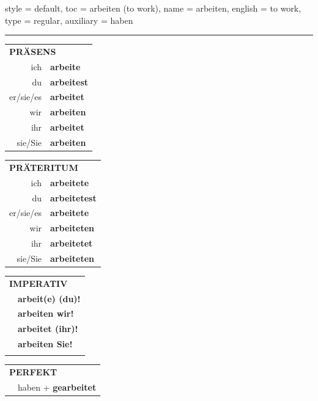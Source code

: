 \begin{verbentry}{
  style = {default},
  toc = {arbeiten (to work)},
  name = {arbeiten},
  english = {to work},
  type = {regular},
  auxiliary = {haben}
}
 
    
     \vspace{5pt}

    \hrule
    
    \vspace{5pt}

  \begin{tabular}{rl}
     \multicolumn{2}{l}{\textbf{PRÄSENS} }\\
    ich & \textbf{arbeite}\\
    du & \textbf{arbeitest}\\
    er/sie/es & \textbf{arbeitet}\\
    wir & \textbf{arbeiten}\\
    ihr & \textbf{arbeitet}\\
    sie/Sie & \textbf{arbeiten}\\
  \end{tabular}
  \hfill
     \begin{tabular}{rl}
    \multicolumn{2}{l}{\textbf{PRÄTERITUM} }\\
    ich & \textbf{arbeitete}\\
    du & \textbf{arbeitetest}\\
    er/sie/es & \textbf{arbeitete}\\
    wir & \textbf{arbeiteten}\\
    ihr & \textbf{arbeitetet}\\
    sie/Sie & \textbf{arbeiteten}\\
  \end{tabular}
  \hfill
  \begin{tabular}{rl}
     \multicolumn{2}{l}{\textbf{IMPERATIV} }\\
   & \textbf{arbeit(e) (du)!}\\
   & \textbf{arbeiten wir!}\\
   & \textbf{arbeitet (ihr)!}\\
   & \textbf{arbeiten Sie!}\\
   & \vspace{10pt}
  \end{tabular}

    \vspace{10pt}

 \begin{tabular}{rl}
     \multicolumn{2}{l}{\textbf{PERFEKT}}\\
   & haben + \textbf{gearbeitet}\\
  \end{tabular}
\hfill
   \begin{tabular}{rl}
   

\end{tabular}
\end{verbentry}
